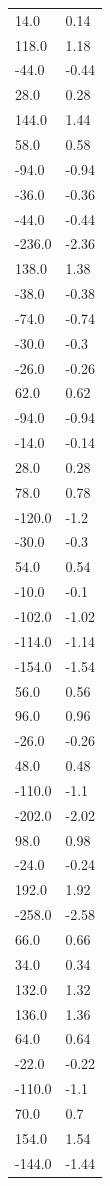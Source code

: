 \begin{longtable}{ll}
14.0 & 0.14 \\
118.0 & 1.18 \\
-44.0 & -0.44 \\
28.0 & 0.28 \\
144.0 & 1.44 \\
58.0 & 0.58 \\
-94.0 & -0.94 \\
-36.0 & -0.36 \\
-44.0 & -0.44 \\
-236.0 & -2.36 \\
138.0 & 1.38 \\
-38.0 & -0.38 \\
-74.0 & -0.74 \\
-30.0 & -0.3 \\
-26.0 & -0.26 \\
62.0 & 0.62 \\
-94.0 & -0.94 \\
-14.0 & -0.14 \\
28.0 & 0.28 \\
78.0 & 0.78 \\
-120.0 & -1.2 \\
-30.0 & -0.3 \\
54.0 & 0.54 \\
-10.0 & -0.1 \\
-102.0 & -1.02 \\
-114.0 & -1.14 \\
-154.0 & -1.54 \\
56.0 & 0.56 \\
96.0 & 0.96 \\
-26.0 & -0.26 \\
48.0 & 0.48 \\
-110.0 & -1.1 \\
-202.0 & -2.02 \\
98.0 & 0.98 \\
-24.0 & -0.24 \\
192.0 & 1.92 \\
-258.0 & -2.58 \\
66.0 & 0.66 \\
34.0 & 0.34 \\
132.0 & 1.32 \\
136.0 & 1.36 \\
64.0 & 0.64 \\
-22.0 & -0.22 \\
-110.0 & -1.1 \\
70.0 & 0.7 \\
154.0 & 1.54 \\
-144.0 & -1.44 \\

\end{longtable}
